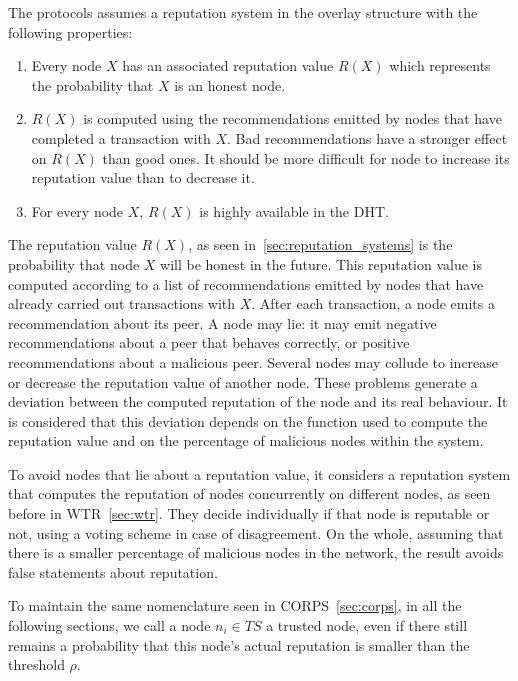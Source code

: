 

The protocols assumes a reputation system in the overlay structure with the following properties:
\begin{enumerate}
  \item Every node $X$ has an associated reputation value $R(X)$
  which represents the probability that $X$ is an honest node.
  \item $R(X)$ is computed using the recommendations emitted
  by nodes that have completed a transaction with $X$. Bad
  recommendations have a stronger effect on $R(X)$ than
  good ones. It should be more difficult for node to
  increase its reputation value than to decrease it.
  \item For every node $X$, $R(X)$ is highly available in the DHT.
\end{enumerate}

The reputation value $R(X)$, as seen in~\ref{sec:reputation_systems} is the probability that node $X$ will
be honest in the future. This reputation value is computed
according to a list of recommendations emitted by nodes that
have already carried out transactions with $X$.
After each transaction, a node emits a recommendation
about its peer. A node may lie: it may emit negative
recommendations about a peer that behaves correctly, or
positive recommendations about a malicious peer. Several nodes
may collude to increase or decrease the reputation value of
another node. These problems generate a deviation between
the computed reputation of the node and its real behaviour. It is
considered that this deviation depends on the function used to
compute the reputation value and on the percentage of malicious
nodes within the system.

To avoid nodes that lie about a reputation value, it considers a reputation
system that computes the reputation of nodes concurrently on different nodes,
as seen before in WTR~\ref{sec:wtr}.
They decide individually if that node is reputable or not, using a voting
scheme in case of disagreement. On the whole, assuming that there is a smaller
percentage of malicious nodes in the network, the result avoids
false statements about reputation.

To maintain the same nomenclature seen in CORPS~\ref{sec:corps}, in all the following sections,
we call a node $n_i \in TS$ a trusted node, even if there still remains a
probability that this node's actual reputation is smaller than the threshold
$\rho$.


